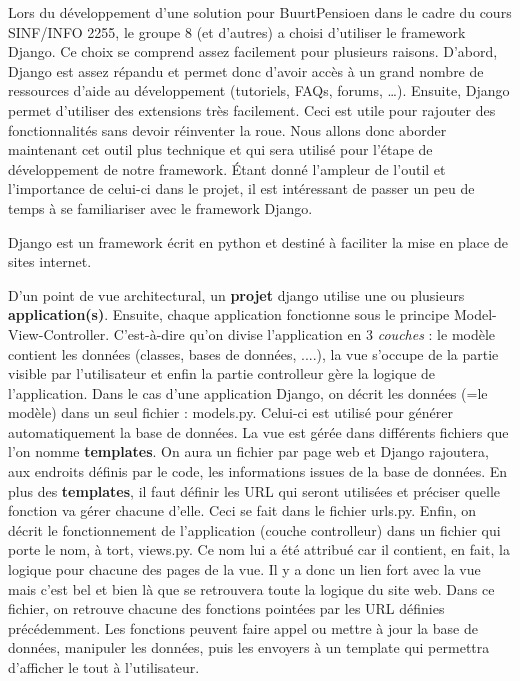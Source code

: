 Lors du développement d'une solution pour BuurtPensioen dans le cadre du cours SINF/INFO 2255,  le groupe 8 (et d'autres) a choisi d'utiliser le framework Django.  Ce choix se comprend assez facilement pour plusieurs raisons.  D'abord,  Django est assez répandu et permet donc d'avoir accès à un grand nombre de ressources d'aide au développement (tutoriels,  FAQs,  forums, \dots ).  Ensuite,  Django permet d'utiliser des extensions très facilement.  Ceci est utile pour rajouter des fonctionnalités sans devoir réinventer la roue.  Nous allons donc aborder maintenant cet outil plus technique et qui sera utilisé pour l'étape de développement de notre framework.  Étant donné l'ampleur de l'outil et l'importance de celui-ci dans le projet,  il est intéressant de passer un peu de temps à se familiariser avec le framework Django.  

\label{django}
Django \cite{django} est un framework écrit en python \cite{python} et destiné à faciliter la mise en place de sites internet.  

D'un point de vue architectural,  un \textbf{projet} django utilise une ou plusieurs \textbf{application(s)}.  Ensuite,  chaque application fonctionne sous le principe Model-View-Controller.  C'est-à-dire qu'on divise l'application en 3 \textit{couches} : le modèle contient les données (classes,  bases de données, ....),  la vue s'occupe de la partie visible par l'utilisateur et enfin la partie controlleur gère la logique de l'application.  Dans le cas d'une application Django,  on décrit les données (=le modèle) dans un seul fichier : models.py.  Celui-ci est utilisé pour générer automatiquement la base de données.  La vue est gérée dans différents fichiers que l'on nomme  \textbf{templates}.  On aura un fichier par page web et Django rajoutera,  aux endroits définis par le code,  les informations issues de la base de données.  En plus des \textbf{templates},  il faut définir les URL qui seront utilisées et préciser quelle fonction va gérer chacune d'elle.  Ceci se fait dans le fichier urls.py.  Enfin,  on décrit le fonctionnement de l'application (couche controlleur) dans un fichier qui porte le nom,  à tort,  views.py.  Ce nom lui a été attribué car il contient,  en fait,  la logique pour chacune des pages de la vue.  Il y a donc un lien fort avec la vue mais c'est bel et bien là que se retrouvera toute la logique du site web.  Dans ce fichier,  on retrouve chacune des fonctions pointées par les URL définies précédemment.  Les fonctions peuvent faire appel ou mettre à jour la base de données,  manipuler les données,  puis les envoyers à un template qui permettra d'afficher le tout à l'utilisateur.  

